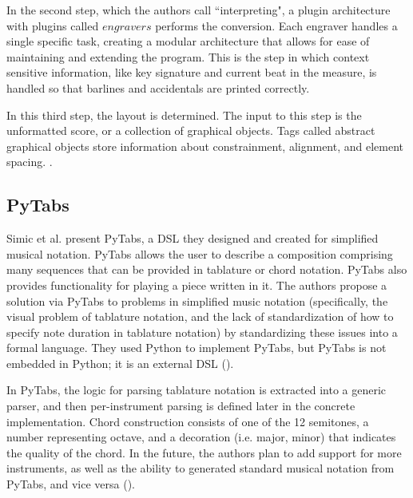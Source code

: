 \documentclass{report}
\newcommand\citeparen[1]{(\cite{#1})}
\begin{document}
In the second step, which the authors call ``interpreting", a plugin architecture with plugins called $engravers$ performs the conversion. Each engraver handles a single specific task, creating a modular architecture that allows for ease of maintaining and extending the program. This is the step in which context sensitive information, like key signature and current beat in the measure, is handled so that barlines and accidentals are printed correctly.

In this third step, the layout is determined. The input to this step is the unformatted score, or a collection of graphical objects. Tags called abstract graphical objects store information about constrainment, alignment, and element spacing. 
\cite{nienhuys_nieuwenhuizen_2003}.

\subsection{PyTabs}
Simic et al. present  PyTabs, a  DSL  they designed and  created  for  simplified musical notation. PyTabs allows the user  to describe a composition comprising many  sequences that  can  be  provided in tablature or chord notation. PyTabs also provides functionality for playing a piece written in it. The authors propose a solution via PyTabs to problems in  simplified  music notation (specifically,  the  visual problem of  tablature  notation, and the lack of  standardization of how  to specify note duration in tablature notation) by  standardizing these issues into a formal language. They used Python to  implement  PyTabs, but PyTabs is not  embedded  in  Python;  it is an external  DSL \citeparen{simic_bal_dejanovic_vaderna}.

In PyTabs, the  logic for parsing tablature  notation is extracted into a  generic parser, and then per-instrument parsing is defined  later in the concrete implementation. Chord construction consists  of one of the 12 semitones, a number representing  octave, and a decoration (i.e. major, minor) that indicates the quality of the  chord.  In the future, the authors plan to add support for more instruments, as  well as the ability to generated standard musical notation from PyTabs,  and  vice versa \citeparen{simic_bal_dejanovic_vaderna}.
\end{document}
